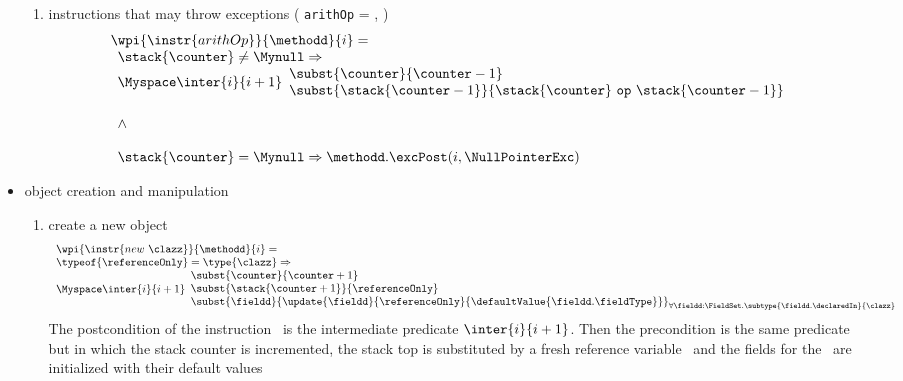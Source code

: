 \begin{itemize}
\begin{enumerate}
						
		\item instructions that may throw exceptions ( \texttt{arithOp} =  ,  )\\
				$$ \begin{array}{l}
                                         \wpi{\instr{arithOp } }{\methodd}{i}   = \\
					 \begin{array}{l}
				                \stack{\counter} \neq \Mynull \Rightarrow \\
						\Myspace  \inter{i}{i+1} \begin{array}{l}
                                                                               \subst{\counter}{ \counter   - 1} \\
						                               \subst{\stack{\counter - 1}} { \stack{\counter} \ \texttt{op}  \ \stack{\counter -1}} 
                                                                          \end{array}\\
						\\
					        \wedge \\				
						\\
						\stack{\counter} = \Mynull \Rightarrow 	\methodd.\excPost(i, \NullPointerExc)             
                               	\end{array} 
				 \end{array}$$
	\end{enumerate}

\item  object creation and manipulation 
	\begin{enumerate}
		\item create a new object \\
		$$ \begin{array}{l}
                         \wpi{\instr{new  \ \clazz }} {\methodd}{i}  =  \\
		\typeof{\referenceOnly} = \type{\clazz} \Rightarrow \\
		     \Myspace \inter{i}{i+1} 
			\begin{array}{l} 
                               \subst{ \counter}{ \counter + 1 } \\
			       \subst{ \stack{ \counter + 1} }{\referenceOnly} \\
		               \subst{ \fieldd} { \update{\fieldd} { \referenceOnly }{\defaultValue{ \fieldd.  \fieldType } } }_{{\small \forall \fieldd: \FieldSet. \subtype{\fieldd.\declaredIn}{  \clazz}} } 
		       \end{array}
              \end{array}$$
		  The postcondition of the instruction \new \ is the intermediate predicate $\inter{i}{i+1}$. Then the precondition is the same predicate but in which the stack
		  counter is incremented, the stack top is substituted by a fresh reference variable  \ and the fields for the 
		   \ are initialized with their default values 
	

\end{enumerate}
\end{itemize}
